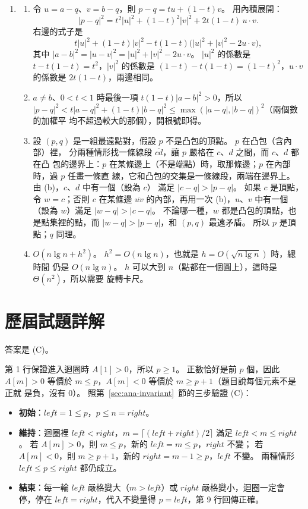 \begin{enumerate}
\item
\begin{enumerate}
\item 令 $u = a - q$、$v = b - q$，則 $p - q = t u + (1 - t) v$。 用內積展開：
\[
|p - q|^2 = t^2 |u|^2 + (1 - t)^2 |v|^2 + 2t(1 - t)\, u \cdot v .
\]
右邊的式子是
\[
t|u|^2 + (1 - t)|v|^2 - t(1 - t)\bigl(|u|^2 + |v|^2 - 2 u \cdot v\bigr),
\]
其中 $|a - b|^2 = |u - v|^2 = |u|^2 + |v|^2 - 2u \cdot v$。 $|u|^2$ 的係數是
$t - t(1 - t) = t^2$，$|v|^2$ 的係數是 $(1 - t) - t(1 - t) = (1 - t)^2$，$u \cdot v$
的係數是 $2t(1 - t)$，兩邊相同。
\item $a \ne b$、$0 < t < 1$ 時最後一項 $t(1 - t)|a - b|^2 > 0$，所以
$|p - q|^2 < t|a - q|^2 + (1 - t)|b - q|^2 \le \max(|a - q|, |b - q|)^2$（兩個數的加權平
均不超過較大的那個），開根號即得。
\item 設 $(p, q)$ 是一組最遠點對，假設 $p$ 不是凸包的頂點。 $p$ 在凸包（含內部）裡，
分兩種情形找一條線段 $\overline{cd}$，讓 $p$ 嚴格在 $c$、$d$ 之間，而 $c$、$d$ 都在凸
包的邊界上：$p$ 在某條邊上（不是端點）時，取那條邊；$p$ 在內部時，過 $p$ 任畫一條直
線，它和凸包的交集是一條線段，兩端在邊界上。 由 (b)，$c$、$d$ 中有一個（設為 $c$）
滿足 $|c - q| > |p - q|$。 如果 $c$ 是頂點，令 $w = c$；否則 $c$ 在某條邊
$\overline{uv}$ 的內部，再用一次 (b)，$u$、$v$ 中有一個（設為 $w$）滿足
$|w - q| > |c - q|$。 不論哪一種，$w$ 都是凸包的頂點，也是點集裡的點，而
$|w - q| > |p - q|$，和 $(p, q)$ 最遠矛盾。 所以 $p$ 是頂點；$q$ 同理。
\item $O(n \lg n + h^2)$。 $h^2 = O(n \lg n)$，也就是 $h = O(\sqrt{n \lg n})$ 時，總時間
仍是 $O(n \lg n)$。 $h$ 可以大到 $n$（點都在一個圓上），這時是 $\Theta(n^2)$，所以需要
旋轉卡尺。
\end{enumerate}

\end{enumerate}

\section*{歷屆試題詳解}

答案是 (C)。

第 1 行保證進入迴圈時 $A[1] > 0$，所以 $p \ge 1$。 正數恰好是前 $p$ 個，因此
$A[m] > 0$ 等價於 $m \le p$，$A[m] < 0$ 等價於 $m \ge p + 1$（題目說每個元素不是正就
是負，沒有 $0$）。 照第~\ref{sec:ana-invariant}~節的三步驗證 (C)：

\begin{itemize}
\item \textbf{初始}：$left = 1 \le p$，$p \le n = right$。
\item \textbf{維持}：迴圈裡 $left < right$，$m = \lceil (left + right)/2 \rceil$ 滿足
$left < m \le right$。 若 $A[m] > 0$，則 $m \le p$，新的 $left = m \le p$，$right$ 不變；
若 $A[m] < 0$，則 $m \ge p + 1$，新的 $right = m - 1 \ge p$，$left$ 不變。 兩種情形
$left \le p \le right$ 都仍成立。
\item \textbf{結束}：每一輪 $left$ 嚴格變大（$m > left$）或 $right$ 嚴格變小，迴圈一定會
停，停在 $left = right$，代入不變量得 $p = left$，第 9 行回傳正確。
\end{itemize}

